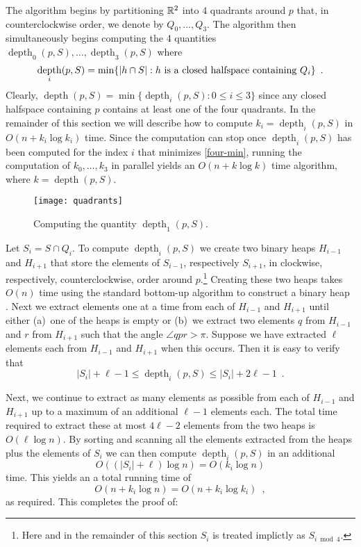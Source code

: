 \documentclass[charterfonts,lotsofwhite]{patmorin}
\DeclareMathOperator{\td}{depth}
\begin{document}
The algorithm begins by partitioning $\mathbb{R}^2$ into 4 quadrants around
$p$ that, in counterclockwise order, we denote by $Q_0,\ldots,Q_3$.
The algorithm then simultaneously begins computing the 4 quantities
$\td_0(p,S),\ldots,\td_3(p,S)$ where 
\begin{equation}
     \td_i(p,S) = \min\{|h\cap S| : \mbox{$h$ is a closed halfspace containing $Q_i$} \} \enspace . \eqlabel{four-min}
\end{equation}
Clearly, $\td(p,S) = \min\{\td_i(p,S): 0\le i \le 3 \}$ since any
closed halfspace containing $p$ contains at least one of the four quadrants.
In the remainder of this section we will describe how to compute
$k_i=\td_i(p,S)$ in $O(n + k_i\log k_i)$ time.  Since the
computation can stop once $\td_i(p,S)$ has been computed for
the index $i$ that minimizes \eqref{four-min}, running the computation
of $k_0,\ldots,k_3$ in parallel yields an $O(n +
k\log k)$ time algorithm, where $k=\td(p,S)$.

\begin{figure}
\begin{center} \texttt{[image: quadrants]} \end{center}
\caption{Computing the quantity $\td_1(p,S)$.}
\end{figure}


Let $S_i=S\cap Q_i$. To compute $\td_i(p,S)$ we create two binary
heaps $H_{i-1}$ and $H_{i+1}$ that store the elements of $S_{i-1}$,
respectively $S_{i+1}$, in clockwise, respectively, counterclockwise,
order around $p$.\footnote{Here and in the remainder of this section
$S_i$ is treated implictly as $S_{i\bmod 4}$.} 
Creating these two heaps takes $O(n)$ time using the
standard bottom-up algorithm to construct a binary heap
\cite[Chapter~6]{clrs01}.
Next we extract elements one at a time from each of $H_{i-1}$ and
$H_{i+1}$ until either (a)~one of the heaps is empty or (b)~we extract
two elements $q$ from $H_{i-1}$ and $r$ from $H_{i+1}$ such that the
angle $\angle qpr > \pi$.  Suppose we have extracted $\ell$ elements
each from $H_{i-1}$ and $H_{i+1}$ when this occurs.  Then it is easy
to verify that 
\[  
  |S_i| + \ell - 1 \le \td_i(p,S) \le |S_i| + 2\ell-1 \enspace .
\]

Next, we continue to extract as many elements as possible from each of
$H_{i-1}$ and $H_{i+1}$ up to a maximum of an additional $\ell-1$
elements each. The total time required to extract these at most
$4\ell-2$ elements from the two heaps is $O(\ell\log n)$.  By sorting and
scanning all the elements extracted from the heaps plus the elements of
$S_i$ we can then compute $\td_i(p,S)$ in an additional
\[
     O((|S_i|+\ell)\log n) = O(k_i\log n)
\] 
time.  This yields an a total running time of 
\[  
   O(n + k_i\log n) = O(n + k_i\log k_i) \enspace ,
\]
as required.  This completes the proof of:
\end{document}

